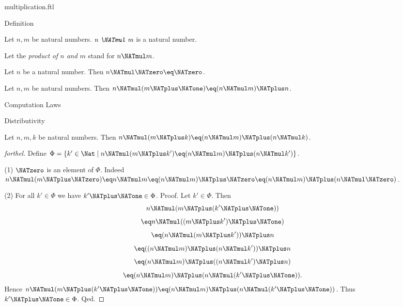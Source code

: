 \documentclass{naproche-library}
\begin{document}
\begin{smodule}[title=Multiplication]{multiplication.ftl}

\begin{sfragment}{Definition}
  \begin{signature}[forthel,id=ARITHMETIC_06_6626346484629504]
    Let $n, m$ be natural numbers.
    $\emph{n \NATmul m}$ is a natural number.

    Let the \emph{product of $n$ and $m$} stand for $n \NATmul m$.
  \end{signature}

  \begin{axiom}[forthel,id=ARITHMETIC_06_8941041092657152]
    Let $n$ be a natural number.
    Then $n \NATmul \NATzero \eq \NATzero$.
  \end{axiom}

  \begin{axiom}[forthel,id=ARITHMETIC_06_2211275408932864]
    Let $n, m$ be natural numbers.
    Then $n \NATmul (m \NATplus \NATone) \eq (n \NATmul m) \NATplus n$.
  \end{axiom}
\end{sfragment}

\begin{sfragment}{Computation Laws}
  \begin{sfragment}{Distributivity}
    \begin{proposition}[forthel,id=ARITHMETIC_06_9001524774567936]
      Let $n, m, k$ be natural numbers.
      Then $n \NATmul (m \NATplus k) \eq (n \NATmul m) \NATplus (n \NATmul k)$.
    \end{proposition}
    \begin{proof}[forthel]
      Define $\Phi = \{ k' \in \Nat \mid n \NATmul (m \NATplus k') \eq (n \NATmul m) \NATplus (n \NATmul k') \}$.

      (1) $\NATzero$ is an element of $\Phi$.
      Indeed $n \NATmul (m \NATplus \NATzero)
        \eq n \NATmul m
        \eq (n \NATmul m) \NATplus \NATzero
        \eq (n \NATmul m) \NATplus (n \NATmul \NATzero)$.

      (2) For all $k' \in \Phi$ we have $k' \NATplus \NATone \in \Phi$. \newline
      Proof.
        Let $k'\in \Phi$.
        Then
        \[  n \NATmul (m \NATplus (k' \NATplus \NATone))                  \]
        \[    \eq n \NATmul ((m \NATplus k') \NATplus \NATone)              \]
        \[    \eq (n \NATmul (m \NATplus k')) \NATplus n              \]
        \[    \eq ((n \NATmul m) \NATplus (n \NATmul k')) \NATplus n    \]
        \[    \eq (n \NATmul m) \NATplus ((n \NATmul k') \NATplus n)    \]
        \[    \eq (n \NATmul m) \NATplus (n \NATmul (k' \NATplus \NATone)).   \]
        Hence $n \NATmul (m \NATplus (k' \NATplus \NATone)) \eq (n \NATmul m) \NATplus (n \NATmul (k' \NATplus \NATone))$.
        Thus $k' \NATplus \NATone \in \Phi$.
      Qed.


\end{proof}
\end{sfragment}
\end{sfragment}
\end{smodule}
\end{document}

